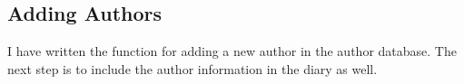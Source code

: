 \subsection{Adding Authors}
\label{task:20140818_jkn0} 
I have written the function for adding a new author in the author database. The next step is to include the author information in the diary as well.

